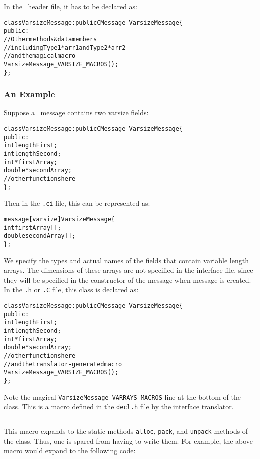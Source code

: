 In the \CC\ header file, it has to be declared as: 

\begin{alltt}
class VarsizeMessage : public CMessage_VarsizeMessage \{ 
  public:
    // Other methods & data members 
    // including Type1 *arr1 and Type2 *arr2
    // and the magical macro
    VarsizeMessage_VARSIZE_MACROS();
\}; 
\end{alltt}

\subsubsection{An Example}

Suppose a \charmpp\ message contains two varsize fields:

\begin{alltt} 
class VarsizeMessage: public CMessage_VarsizeMessage \{
  public:
    int lengthFirst;
    int lengthSecond;
    int* firstArray;
    double* secondArray;
    // other functions here
\};
\end{alltt}

Then in the \texttt{.ci} file, this can be represented as: 

\begin{alltt}
message [varsize] VarsizeMessage \{
  int firstArray[];
  double secondArray[];
\};
\end{alltt}

We specify the types and actual names of the fields that
contain variable length arrays. The dimensions of these arrays are not
specified in the interface file, since they will be specified in the
constructor of the message when message is created. In the {\tt .h} or {\tt .C}
file, this class is declared as:

\begin{alltt} 

class VarsizeMessage : public CMessage_VarsizeMessage \{ 
  public: 
    int lengthFirst;
    int lengthSecond;
    int* firstArray;
    double* secondArray;
    // other functions here
    // and the translator-generated macro
    VarsizeMessage_VARSIZE_MACROS();
\};
\end{alltt}

Note the magical \texttt{VarsizeMessage\_VARRAYS\_MACROS} line at the bottom of
the  class. This is a macro defined in the \texttt{decl.h}
file by the interface translator.

\tiny
\hrule
This macro expands to the static methods
\texttt{alloc}, \texttt{pack}, and \texttt{unpack} methods of the
 class. Thus, one is spared from having to write them.
For example, the above macro would expand to the following code:


